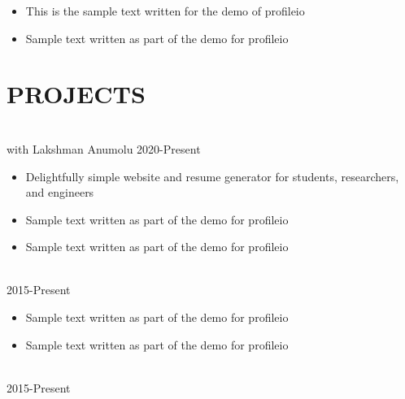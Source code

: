 \documentclass{res}
\begin{document}
\begin{resume}
\begin{itemize}[leftmargin=\parindent]
		\item This is the sample text written for the demo of profileio
		\item Sample text written as part of the demo for profileio
	\end{itemize}
	
	
		
	
	\section{\MakeUppercase{Projects}} \vskip 0.15in
	
	\hspace*{-0.25in}{\bf ProfileIO} \\
	\hspace*{-0.25in}with Lakshman Anumolu \hfill 2020-Present
	\begin{itemize}[leftmargin=\parindent]
	\setlength{\itemsep}{0mm} \smallskip
	
	\item Delightfully simple website and resume generator for students, researchers, and engineers
	\item Sample text written as part of the demo for profileio
	\item Sample text written as part of the demo for profileio
	\end{itemize}
	
	\hspace*{-0.25in}{\bf Project VI} \\
	\hspace*{-0.25in} \hfill 2015-Present
	\begin{itemize}[leftmargin=\parindent]
	\setlength{\itemsep}{0mm} \smallskip
	
	\item Sample text written as part of the demo for profileio
	\item Sample text written as part of the demo for profileio
	\end{itemize}
	
	\hspace*{-0.25in}{\bf Project V} \\
	\hspace*{-0.25in} \hfill 2015-Present
	\begin{itemize}[leftmargin=\parindent]
	\setlength{\itemsep}{0mm} \smallskip
	

\end{itemize}
\end{resume}
\end{document}
